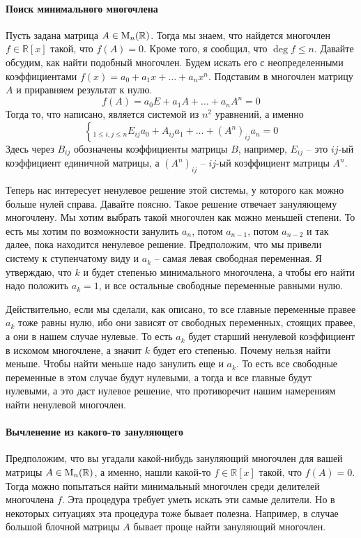 \paragraph{Поиск минимального многочлена}

Пусть задана матрица $A\in \operatorname{M}_{n}(\mathbb R)$.
Тогда мы знаем, что найдется многочлен $f\in\mathbb R[x]$ такой, что $f(A) = 0$.
Кроме того, я сообщил, что $\deg f\leqslant n$.
Давайте обсудим, как найти подобный многочлен.
Будем искать его с неопределенными коэффициентами $f(x) = a_0 + a_1 x + \ldots + a_n x^n$.
Подставим в многочлен матрицу $A$ и приравняем результат к нулю.
\[
f(A) = a_0 E + a_1 A + \ldots + a_n A^n = 0
\]
Тогда то, что написано, является системой из $n^2$ уравнений, а именно
\[
\left\{_{1\leqslant i,j\leqslant n}
E_{ij}a_0 + A_{ij}a_1 + \ldots + (A^n)_{ij}a_n = 0
\right.
\]
Здесь через $B_{ij}$ обозначены коэффициенты матрицы $B$, например, $E_{ij}$ -- это $ij$-ый коэффициент единичной матрицы, а $(A^n)_{ij}$ -- $ij$-ый коэффициент матрицы $A^n$.

Теперь нас интересует ненулевое решение этой системы, у которого как можно больше нулей справа.
Давайте поясню.
Такое решение отвечает зануляющему многочлену.
Мы хотим выбрать такой многочлен как можно меньшей степени.
То есть мы хотим по возможности занулить $a_n$, потом $a_{n-1}$, потом $a_{n-2}$ и так далее, пока находится ненулевое решение.
Предположим, что мы привели систему к ступенчатому виду и $a_k$ -- самая левая свободная переменная.
Я утверждаю, что $k$ и будет степенью минимального многочлена, а чтобы его найти надо положить $a_k = 1$, и все остальные свободные переменные равными нулю.

Действительно, если мы сделали, как описано, то все главные переменные правее $a_k$ тоже равны нулю, ибо они зависят от свободных переменных, стоящих правее, а они в нашем случае нулевые.
То есть $a_k$ будет старший ненулевой коэффициент в искомом многочлене, а значит $k$ будет его степенью.
Почему нельзя найти меньше.
Чтобы найти меньше надо занулить еще и $a_k$.
То есть все свободные переменные в этом случае будут нулевыми, а тогда и все главные будут нулевыми, а это даст нулевое решение, что противоречит нашим намерениям найти ненулевой многочлен.

\paragraph{Вычленение из какого-то зануляющего}

Предположим, что вы угадали какой-нибудь зануляющий многочлен для вашей матрицы $A\in\operatorname{M}_{n}(\mathbb R)$, а именно, нашли какой-то $f\in \mathbb R[x]$ такой, что $f(A) = 0$.
Тогда можно попытаться найти минимальный многочлен среди делителей многочлена $f$.
Эта процедура требует уметь искать эти самые делители.
Но в некоторых ситуациях эта процедура тоже бывает полезна.
Например, в случае большой блочной матрицы $A$ бывает проще найти зануляющий многочлен.

